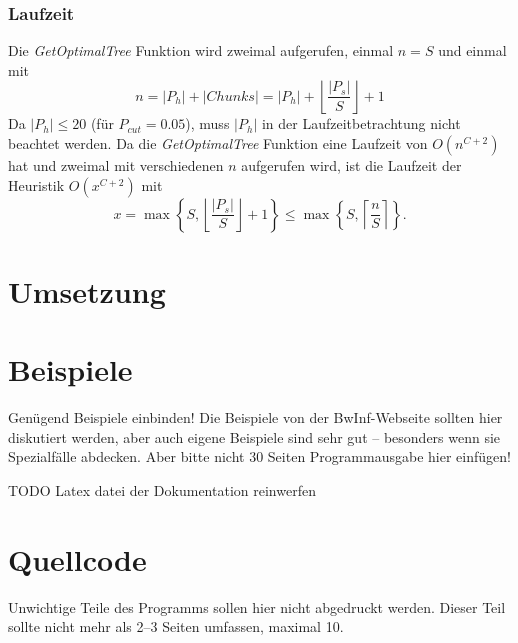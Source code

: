 \documentclass[a4paper,10pt,ngerman]{scrartcl}
\begin{document}
    \subsubsection{Laufzeit}
    Die \textit{GetOptimalTree} Funktion wird zweimal aufgerufen, einmal $n = S$ und einmal mit
    \[n = |P_h| + |Chunks| = |P_h| +  \left\lfloor   \frac {|P_s|} {S}  \right\rfloor + 1\]
    Da $|P_h| \le 20$ (für $P_{cut} = 0.05$), muss $|P_h|$ in der Laufzeitbetrachtung nicht beachtet werden.
    Da die \textit{GetOptimalTree} Funktion eine Laufzeit von $O\left(n^{C+2}\right)$ hat und zweimal mit verschiedenen $n$ aufgerufen wird, ist die Laufzeit der Heuristik $O(x^{C+2})$ mit
    \[x = \max \left\{ S, \left\lfloor   \frac {|P_s|} {S}  \right\rfloor + 1 \right\} \le \max \left\{S, \left\lceil \frac n S \right\rceil \right\}.\]


    \section{Umsetzung}


    \section{Beispiele}

    \begin{figure}

    \end{figure}

    Genügend Beispiele einbinden! Die Beispiele von der BwInf-Webseite sollten hier diskutiert werden, aber auch eigene Beispiele sind sehr gut – besonders wenn sie Spezialfälle abdecken. Aber bitte nicht 30 Seiten Programmausgabe hier einfügen!

    TODO Latex datei der Dokumentation reinwerfen


    \section{Quellcode}
    Unwichtige Teile des Programms sollen hier nicht abgedruckt werden. Dieser Teil sollte nicht mehr als 2–3 Seiten umfassen, maximal 10.
\end{document}
